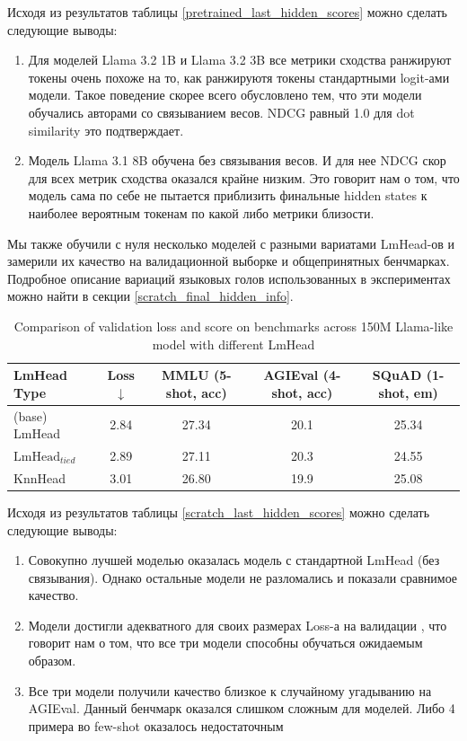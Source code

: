 Исходя из результатов таблицы \ref{pretrained_last_hidden_scores} можно сделать следующие выводы:
\begin{enumerate}
    \item Для моделей Llama 3.2 1B и Llama 3.2 3B все метрики сходства ранжируют токены очень похоже на то, как ранжируютя токены стандартными logit-ами модели. Такое поведение скорее всего обусловлено тем, что эти модели обучались авторами со связыванием весов. NDCG равный 1.0 для dot similarity это подтверждает.
    \item Модель Llama 3.1 8B обучена без связывания весов. И для нее NDCG скор для всех метрик сходства оказался крайне низким. Это говорит нам о том, что модель сама по себе не пытается приблизить финальные hidden states к наиболее вероятным токенам по какой либо метрики близости.
\end{enumerate}

Мы также обучили с нуля несколько моделей с разными вариатами LmHead-ов и замерили их качество на валидационной выборке и общепринятных бенчмарках. Подробное описание вариаций языковых голов использованных в экспериментах можно найти в секции \ref{scratch_final_hidden_info}.


\begin{table}[h]
    \centering
    \caption{Comparison of validation loss and score on benchmarks across 150M Llama-like model with different LmHead}
    \begin{tabular}{lcccc}
    \toprule
    LmHead Type & Loss $\downarrow$ & MMLU (5-shot, acc) & AGIEval (4-shot, acc) & SQuAD (1-shot, em) \\
    \midrule
    (base) LmHead           & 2.84 & 27.34  & 20.1 & 25.34 \\
    $\text{LmHead}_{tied}$  & 2.89 & 27.11  & 20.3 & 24.55 \\
    KnnHead                 & 3.01 & 26.80  & 19.9 & 25.08 \\
    \bottomrule
    \end{tabular}
    \label{tab:scratch_last_hidden_scores}
\end{table}

Исходя из результатов таблицы \ref{scratch_last_hidden_scores} можно сделать следующие выводы:
\begin{enumerate}
    \item Совокупно лучшей моделью оказалась модель с стандартной LmHead (без связывания). Однако остальные модели не разломались и показали сравнимое качество.
    \item Модели достигли адекватного для своих размерах Loss-а на валидации \cite{TODO}, что говорит нам о том, что все три модели способны обучаться ожидаемым образом.
    \item Все три модели получили качество близкое к случайному угадыванию на AGIEval. Данный бенчмарк оказался слишком сложным для моделей. Либо 4 примера во few-shot оказалось недостаточным
\end{enumerate}

